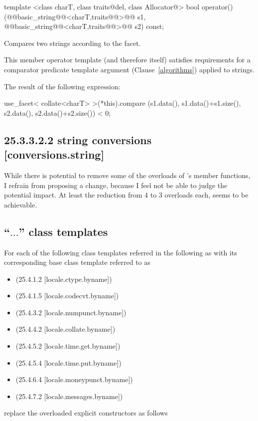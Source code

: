 \documentclass[ebook,11pt,article]{memoir}
\begin{document}
\begin{itemdecl}
template <class charT, class traits@del{, class Allocator}@>
  bool operator()(@@basic_string@@<charT,traits@@>@\removed{\&}@ s1,
                  @@basic_string@@<charT,traits@@>@\removed{\&}@ s2) const;
\end{itemdecl}

\begin{itemdescr}
\pnum
\effects
Compares two strings according to the
facet.

\pnum
\remarks
This member operator template (and therefore
itself) satisfies requirements for a comparator predicate template argument
(Clause~\ref{algorithms}) applied to strings.

\pnum
\returns
The result of the following expression:

\begin{codeblock}
use_facet< collate<charT> >(*this).compare
  (s1.data(), s1.data()+s1.size(), s2.data(), s2.data()+s2.size()) < 0;
\end{codeblock}
\end{itemdescr}

\subsection{25.3.3.2.2 string conversions [conversions.string]}
While there is potential to remove some of the overloads of 's member functions, I refrain from proposing a change, because I feel not be able to judge the potential impact. At least the reduction from 4 to 3 overloads each, seems to be achievable.

\subsection{ ``$\ldots$'' class templates }
For each of the following class templates referred in the following as  with its corresponding base class template referred to as 
\begin{itemize}
\item {} (25.4.1.2 [locale.ctype.byname])
\item {} (25.4.1.5 [locale.codecvt.byname])
\item {} (25.4.3.2 [locale.numpunct.byname])
\item {} (25.4.4.2 [locale.collate.byname])
\item {} (25.4.5.2 [locale.time.get.byname])
\item {} (25.4.5.4 [locale.time.put.byname])
\item {} (25.4.6.4 [locale.moneypunct.byname])
\item {} (25.4.7.2 [locale.messages.byname])
\end{itemize}
replace the overloaded explicit constructors as follows
\end{document}
